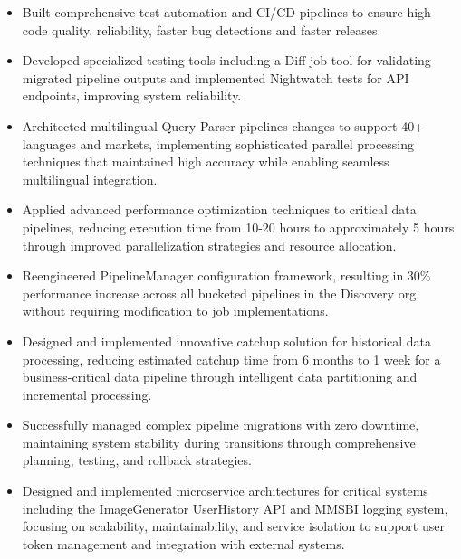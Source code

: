 \begin{itemize}
    \item \scriptsize{Built comprehensive test automation and CI/CD pipelines to ensure high code 
        quality, reliability, faster bug detections and faster releases.}

    \item \scriptsize{Developed specialized testing tools including a Diff job tool for validating 
        migrated pipeline outputs and implemented Nightwatch tests for API endpoints, improving system
        reliability.}

    \item \scriptsize{Architected multilingual Query Parser pipelines changes to support 40+ languages 
        and markets, implementing sophisticated parallel processing techniques that maintained high 
        accuracy while enabling seamless multilingual integration.}
    
    \item \scriptsize{Applied advanced performance optimization techniques to critical data pipelines, 
        reducing execution time from 10-20 hours to approximately 5 hours through improved 
        parallelization strategies and resource allocation.}
    
    \item \scriptsize{Reengineered PipelineManager configuration framework, resulting in 30\% 
        performance increase across all bucketed pipelines in the Discovery org without requiring 
        modification to job implementations.}
        
    \item \scriptsize{Designed and implemented innovative catchup solution for historical data 
        processing, reducing estimated catchup time from 6 months to 1 week for a business-critical data 
        pipeline through intelligent data partitioning and incremental processing.}
        
    \item \scriptsize{Successfully managed complex pipeline migrations with zero downtime, maintaining 
        system stability during transitions through comprehensive planning, testing, and rollback 
        strategies.}

    \item \scriptsize{Designed and implemented microservice architectures for critical systems including 
        the ImageGenerator UserHistory API and MMSBI logging system, focusing on scalability, 
        maintainability, and service isolation to support user token management and integration with 
        external systems.}
        

\end{itemize}
